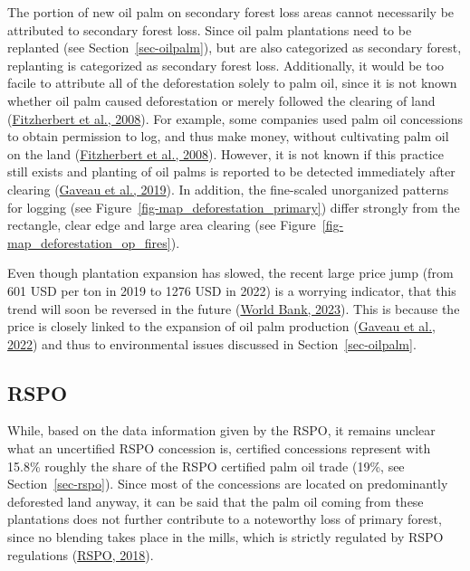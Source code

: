 \documentclass[
  letterpaper,
  DIV=11,
  numbers=noendperiod]{scrreprt}
\begin{document}
The portion of new oil palm on secondary forest loss areas cannot
necessarily be attributed to secondary forest loss. Since oil palm
plantations need to be replanted (see Section~\ref{sec-oilpalm}), but
are also categorized as secondary forest, replanting is categorized as
secondary forest loss. Additionally, it would be too facile to attribute
all of the deforestation solely to palm oil, since it is not known
whether oil palm caused deforestation or merely followed the clearing of
land (\protect\hyperlink{ref-fitzherbertHowWillOil2008}{Fitzherbert et
al., 2008}). For example, some companies used palm oil concessions to
obtain permission to log, and thus make money, without cultivating palm
oil on the land
(\protect\hyperlink{ref-fitzherbertHowWillOil2008}{Fitzherbert et al.,
2008}). However, it is not known if this practice still exists and
planting of oil palms is reported to be detected immediately after
clearing (\protect\hyperlink{ref-gaveauRiseFallForest2019}{Gaveau et
al., 2019}). In addition, the fine-scaled unorganized patterns for
logging (see Figure~\ref{fig-map_deforestation_primary}) differ strongly
from the rectangle, clear edge and large area clearing (see
Figure~\ref{fig-map_deforestation_op_fires}).

Even though plantation expansion has slowed, the recent large price jump
(from 601 USD per ton in 2019 to 1276 USD in 2022) is a worrying
indicator, that this trend will soon be reversed in the future
(\protect\hyperlink{ref-worldbankAveragePricesPalm2023}{World Bank,
2023}). This is because the price is closely linked to the expansion of
oil palm production
(\protect\hyperlink{ref-gaveauSlowingDeforestationIndonesia2022}{Gaveau
et al., 2022}) and thus to environmental issues discussed in
Section~\ref{sec-oilpalm}.

\hypertarget{rspo}{%
\subsection{RSPO}\label{rspo}}

While, based on the data information given by the RSPO, it remains
unclear what an uncertified RSPO concession is, certified concessions
represent with 15.8\% roughly the share of the RSPO certified palm oil
trade (19\%, see Section~\ref{sec-rspo}). Since most of the concessions
are located on predominantly deforested land anyway, it can be said that
the palm oil coming from these plantations does not further contribute
to a noteworthy loss of primary forest, since no blending takes place in
the mills, which is strictly regulated by RSPO regulations
(\protect\hyperlink{ref-rspoRSPOPrinciplesCriteria2018}{RSPO, 2018}).
\end{document}
